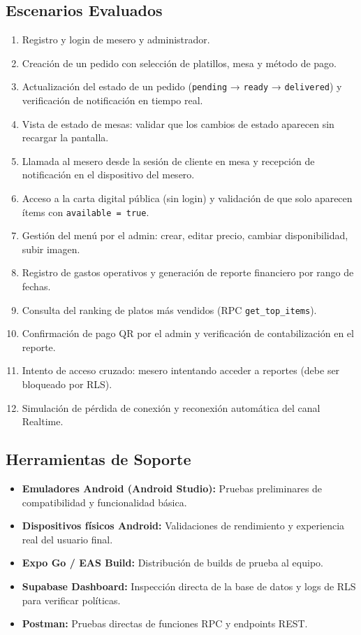 \subsection{Escenarios Evaluados}

\begin{enumerate}[leftmargin=1.8em]
  \item Registro y login de mesero y administrador.
  \item Creación de un pedido con selección de platillos, mesa y método de pago.
  \item Actualización del estado de un pedido (\texttt{pending} → \texttt{ready}
        → \texttt{delivered}) y verificación de notificación en tiempo real.
  \item Vista de estado de mesas: validar que los cambios de estado aparecen
        sin recargar la pantalla.
  \item Llamada al mesero desde la sesión de cliente en mesa y recepción de
        notificación en el dispositivo del mesero.
  \item Acceso a la carta digital pública (sin login) y validación de que solo
        aparecen ítems con \texttt{available = true}.
  \item Gestión del menú por el admin: crear, editar precio, cambiar disponibilidad,
        subir imagen.
  \item Registro de gastos operativos y generación de reporte financiero por rango
        de fechas.
  \item Consulta del ranking de platos más vendidos (RPC \texttt{get\_top\_items}).
  \item Confirmación de pago QR por el admin y verificación de contabilización
        en el reporte.
  \item Intento de acceso cruzado: mesero intentando acceder a reportes
        (debe ser bloqueado por RLS).
  \item Simulación de pérdida de conexión y reconexión automática del canal
        Realtime.
\end{enumerate}

\subsection{Herramientas de Soporte}

\begin{itemize}[leftmargin=1.5em]
  \item \textbf{Emuladores Android (Android Studio):} Pruebas preliminares de
        compatibilidad y funcionalidad básica.
  \item \textbf{Dispositivos físicos Android:} Validaciones de rendimiento y
        experiencia real del usuario final.
  \item \textbf{Expo Go / EAS Build:} Distribución de builds de prueba al equipo.
  \item \textbf{Supabase Dashboard:} Inspección directa de la base de datos y
        logs de RLS para verificar políticas.
  \item \textbf{Postman:} Pruebas directas de funciones RPC y endpoints REST.
\end{itemize}

